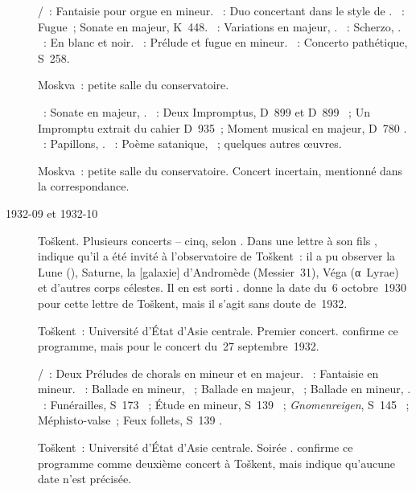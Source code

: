 \begin{description}
 \textsc{\Mozart{}/\Busoni{}}~: Fantaisie pour orgue en \kF mineur.
 \textsc{\Busoni{}}~: Duo concertant dans le style de \Mozart{}.
 \textsc{\Mozart{}}~: Fugue~; Sonate en \kD majeur, K~448.
 \textsc{\Schumann{}}~: Variations en \kB \Flat majeur, .
 \textsc{\SaintSaens{}}~: Scherzo, .
 \textsc{\Debussy{}}~: En blanc et noir.
 \textsc{\Taneiev{}}~: Prélude et fugue en \kG \Sharp mineur.
 \textsc{\Liszt{}}~: Concerto pathétique, S~258.
 \item[\DateWithWeekDay{1932-06-24}]
 Moskva~: petite salle du conservatoire.

 \textsc{\Beethoven{}}~: Sonate en \kD majeur, .
 \textsc{\Schubert{}}~: Deux Impromptus, D~899  et D~899
 ~; Un Impromptu extrait du cahier D~935~; Moment musical en \kA
 \Flat majeur, D~780 .
 \textsc{\Schumann{}}~: Papillons, .
 \textsc{\Scriabine{}}~: Poème satanique, ~; quelques autres
 œuvres.
 \item[\DateWithWeekDay{1932-07-17}]
 Moskva~: petite salle du conservatoire.
 Concert incertain, mentionné dans la correspondance.
 \item[1932-09 et 1932-10]
 Toškent.
 Plusieurs concerts -- cinq, selon \citet[p.~155]{Nekrasova08}.
 Dans une lettre à son fils \citet[p.~44]{Sofronitsky82b}, \VSofronitsky{}
 indique qu'il a été invité à l'observatoire de Toškent~: il a pu observer
 la Lune (), Saturne, la [galaxie]
 d'Andromède (Messier~31), Véga (α~Lyrae) et d'autres corps célestes.
 Il en est sorti .
 \citet[p.~44]{Sofronitsky82b} donne la date du~6 octobre~1930 pour cette
 lettre de Toškent, mais il s'agit sans doute de~1932.
 \item[\DateWithWeekDay{1932-09-24}]
 Toškent~: Université d'\hbox{État} d'\hbox{Asie} centrale.
 Premier concert.
 \citet[p.~155]{Nekrasova08} confirme ce programme, mais pour le concert
 du~27 septembre~1932.

 \textsc{\JBach{}/\Busoni{}}~: Deux Préludes de chorals en \kG mineur et en
 \kG majeur.
 \textsc{\Mozart{}}~: Fantaisie en \kC mineur.
 \textsc{\Chopin{}}~: Ballade en \kF mineur, ~; Ballade en \kA
 \Flat majeur, ~; Ballade en \kG mineur, .
 \textsc{\Liszt{}}~: Funérailles, S~173 ~; Étude en \kF mineur,
 S~139 ~; \emph{Gnomenreigen}, S~145 ~;
 Méphisto-valse~; Feux follets, S~139 .
 \item[\DateWithWeekDay{1932-09-27}]
 Toškent~: Université d'\hbox{État} d'\hbox{Asie} centrale.
 Soirée \Chopin{}.
 \citet[p.~155]{Nekrasova08} confirme ce programme comme deuxième concert à
 Toškent, mais indique qu'aucune date n'est précisée.


\end{description}
